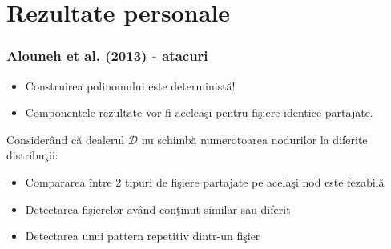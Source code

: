 \documentclass{beamer}
\theoremstyle{definition}
\begin{document}
\section{Rezultate personale}
\begin{frame}
    \frametitle{Alouneh et al. (2013) - atacuri}
     {
        \begin{itemize}
            \item Construirea polinomului este determinist\u{a}!
            \pause
            \item Componentele rezultate vor fi acelea\c{s}i pentru fi\c{s}iere identice partajate.
        \end{itemize}
    }
     {
        Consider\^{a}nd c\u{a} dealerul $\mathcal{D}$ nu schimb\u{a} numerotoarea nodurilor la diferite distribu\c{t}ii:
        \begin{itemize}
            \item Compararea \^{i}ntre 2 tipuri de fi\c{s}iere partajate pe acela\c{s}i nod este fezabil\u{a}
            \pause
            \item Detectarea fi\c{s}ierelor av\^{a}nd con\c{t}inut similar sau diferit
            \pause
            \item Detectarea unui pattern repetitiv dintr-un fi\c{s}ier
        \end{itemize}
    }
\end{frame}
\end{document}
